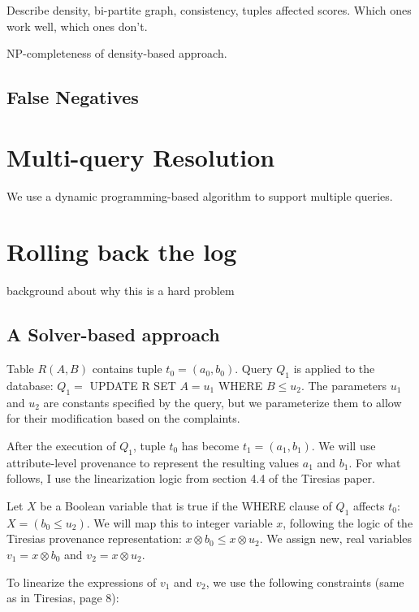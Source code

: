 Describe density, bi-partite graph, consistency, tuples affected scores.  Which ones work well, which ones don't.

NP-completeness of density-based approach.


\subsection{False Negatives}



\section{Multi-query Resolution}

We use a dynamic programming-based algorithm to support multiple queries.




\section{Rolling back the log}

background about why this is a hard problem

\subsection{A Solver-based approach}

Table $R(A,B)$ contains tuple $t_0=(a_0,b_0)$. Query $Q_1$ is applied to the
database: $Q_1 =$ UPDATE R SET $A=u_1$ WHERE $B\leq u_2$. The parameters $u_1$
and $u_2$ are constants specified by the query, but we parameterize them to
allow for their modification based on the complaints.

\smallskip

After the execution of $Q_1$, tuple $t_0$ has become $t_1=(a_1,b_1)$. We will
use attribute-level provenance to represent the resulting values $a_1$ and
$b_1$. For what follows, I use the linearization logic from section 4.4 of the
Tiresias paper.

\smallskip


Let $X$ be a Boolean variable that is true if the WHERE clause of $Q_1$
affects $t_0$: $X=(b_0\leq u_2)$. We will map this to integer variable $x$,
following the logic of the Tiresias provenance representation: $x\otimes
b_0\leq x\otimes u_2$.  We assign new, real variables $v_1= x\otimes
b_0$ and $v_2=x\otimes u_2$.

\smallskip

To linearize the expressions of $v_1$ and $v_2$, we use the following constraints (same as in Tiresias, page 8):

